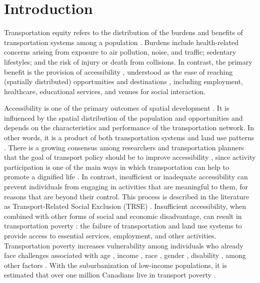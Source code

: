 \documentclass[preprint, 3p,
authoryear]{elsarticle} %
\begin{document}
\section{Introduction}\label{introduction}

Transportation equity refers to the distribution of the burdens and
benefits of transportation systems among a population
\citep{karner2020, pereira2017}. Burdens include health-related concerns
arising from exposure to air pollution, noise, and traffic; sedentary
lifestyles; and the risk of injury or death from collisions. In
contrast, the primary benefit is the provision of accessibility
\citep{pereira2021}, understood as the ease of reaching (spatially
distributed) opportunities and destinations
\citep{páez2012, hansen1959, soukhov2025}, including employment,
healthcare, educational services, and venues for social interaction.

Accessibility is one of the primary outcomes of spatial development
\citep{páez2012}. It is influenced by the spatial distribution of the
population and opportunities and depends on the characteristics and
performance of the transportation network. In other words, it is a
product of both transportation systems and land use patterns
\citep{wee2011}. There is a growing consensus among researchers and
transportation planners that the goal of transport policy should be to
improve accessibility \citep{el-geneidy2022, boisjoly2017}, since
activity participation is one of the main ways in which transportation
can help to promote a dignified life \citep{karner2020, dossantos}. In
contrast, insufficient or inadequate accessibility can prevent
individuals from engaging in activities that are meaningful to them, for
reasons that are beyond their control. This process is described in the
literature as Transport-Related Social Exclusion (TRSE)
\citep{litman2024, lucas2012, preston2007, luz2022, paez2009mobility}.
Insufficient accessibility, when combined with other forms of social and
economic disadvantage, can result in transportation poverty
\citep{lucas2019, luz2022}: the failure of transportation and land use
systems to provide access to essential services, employment, and other
activities. Transportation poverty increases vulnerability among
individuals who already face challenges associated with age
\citep{vandülmen2022}, income \citep{allen2019}, race
\citep{awaworyichurchill2020}, gender \citep{murphy2023}, disability
\citep{upham2022}, among other factors \citep{kim2024}. With the
suburbanization of low-income populations, it is estimated that over one
million Canadians live in transport poverty \citep{allen2019}.
\end{document}
